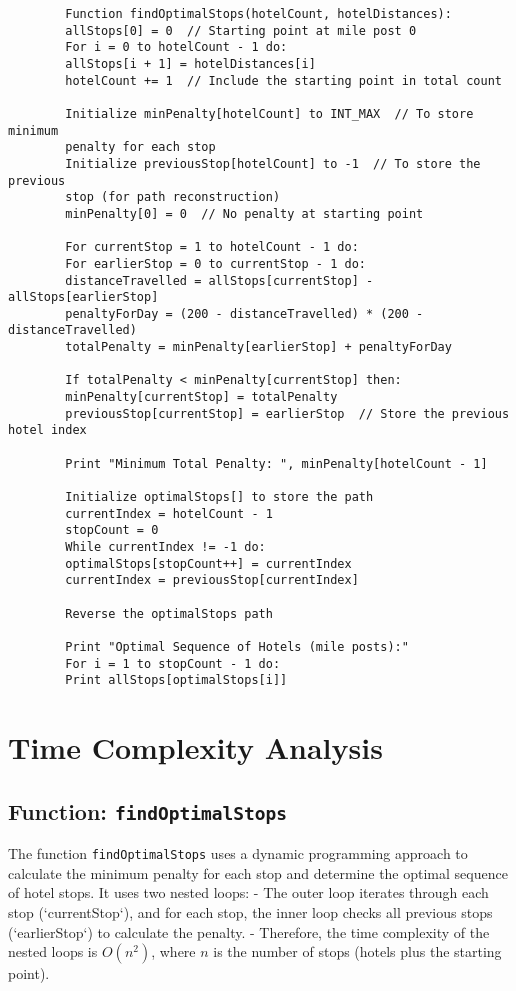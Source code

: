 \documentclass[a4paper,12pt]{report}
\begin{document}
\begin{tcolorbox}[colback=white, colframe=black, boxrule=0.5pt]
	\ttfamily\small
	\begin{verbatim}
		Function findOptimalStops(hotelCount, hotelDistances):
		allStops[0] = 0  // Starting point at mile post 0
		For i = 0 to hotelCount - 1 do:
		allStops[i + 1] = hotelDistances[i]
		hotelCount += 1  // Include the starting point in total count
		
		Initialize minPenalty[hotelCount] to INT_MAX  // To store minimum
		penalty for each stop
		Initialize previousStop[hotelCount] to -1  // To store the previous
		stop (for path reconstruction)
		minPenalty[0] = 0  // No penalty at starting point
		
		For currentStop = 1 to hotelCount - 1 do:
		For earlierStop = 0 to currentStop - 1 do:
		distanceTravelled = allStops[currentStop] - allStops[earlierStop]
		penaltyForDay = (200 - distanceTravelled) * (200 - distanceTravelled)
		totalPenalty = minPenalty[earlierStop] + penaltyForDay
		
		If totalPenalty < minPenalty[currentStop] then:
		minPenalty[currentStop] = totalPenalty
		previousStop[currentStop] = earlierStop  // Store the previous hotel index
		
		Print "Minimum Total Penalty: ", minPenalty[hotelCount - 1]
		
		Initialize optimalStops[] to store the path
		currentIndex = hotelCount - 1
		stopCount = 0
		While currentIndex != -1 do:
		optimalStops[stopCount++] = currentIndex
		currentIndex = previousStop[currentIndex]
		
		Reverse the optimalStops path
		
		Print "Optimal Sequence of Hotels (mile posts):"
		For i = 1 to stopCount - 1 do:
		Print allStops[optimalStops[i]]
	\end{verbatim}
\end{tcolorbox}

\section*{Time Complexity Analysis}

\subsection*{Function: \texttt{findOptimalStops}}

The function \texttt{findOptimalStops} uses a dynamic programming approach to calculate the minimum penalty for each stop and determine the optimal sequence of hotel stops. It uses two nested loops:
- The outer loop iterates through each stop (`currentStop`), and for each stop, the inner loop checks all previous stops (`earlierStop`) to calculate the penalty.
- Therefore, the time complexity of the nested loops is \(O(n^2)\), where \(n\) is the number of stops (hotels plus the starting point).
\end{document}
